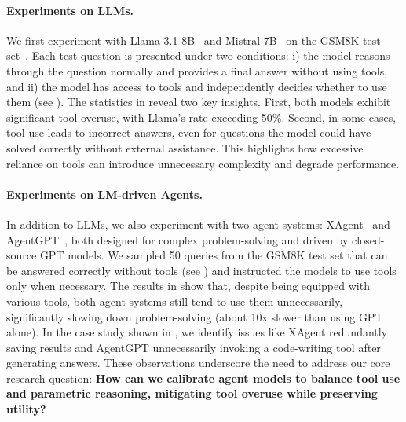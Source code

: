 \label{sec:preliminary_llm}
\paragraph{Experiments on LLMs.}
We first experiment with Llama-3.1-8B~\citep{dubey2024llama} and Mistral-7B~\citep{jiang2023mistral} on the GSM8K test set~\citep{cobbe2021training}. Each test question is presented under two conditions: i) the model reasons through the question normally and provides a final answer without using tools, and ii) the model has access to tools and independently decides whether to use them (see ). The statistics in  reveal two key insights. First, both models exhibit significant tool overuse, with Llama's rate exceeding 50\%. Second, in some cases, tool use leads to incorrect answers, even for questions the model could have solved correctly without external assistance. This highlights how excessive reliance on tools can introduce unnecessary complexity and degrade performance.

\paragraph{Experiments on LM-driven Agents.} 
In addition to LLMs, we also experiment with two agent systems: XAgent~\citep{xagent2023} and AgentGPT~\citep{2024agentgpt}, both designed for complex problem-solving and driven by closed-source GPT models. We sampled 50 queries from the GSM8K test set that can be answered correctly without tools (see ) and instructed the models to use tools only when necessary. The results in  show that, despite being equipped with various tools, both agent systems still tend to use them unnecessarily, significantly slowing down problem-solving (about 10x slower than using GPT alone). In the case study shown in , we identify issues like XAgent redundantly saving results and AgentGPT unnecessarily invoking a code-writing tool after generating answers. These observations underscore the need to address our core research question: \textbf{How can we calibrate agent models to balance tool use and parametric reasoning, mitigating tool overuse while preserving utility?}
